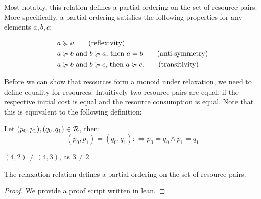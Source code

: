 Most notably, this relation defines a partial ordering on the set of resource pairs. More specifically, a partial ordering satisfies the following properties for any elements \(a, b, c\):

\begin{align}
   & a \relaxation a \tag{reflexivity} \\
   & a \relaxation b \text{ and } b \relaxation a\text{, then } a = b \tag{anti-symmetry}\\
   & a \relaxation b \text{ and } b \relaxation c\text{, then } a \relaxation c. \tag{transitivity}
\end{align}

Before we can show that resources form a monoid under relaxation, we need to define equality for resources. Intuitively two resource pairs are equal, if the respective initial cost is equal and the resource consumption is equal. Note that this is equivalent to the following definition:

\begin{definition}
   Let \((p_0, p_1), (q_0, q_1) \in \mathcal{R}\), then: 
   \[
      (p_0, p_1) = (q_0, q_1) :\iff p_0 = q_0 \wedge p_1 = q_1
   \]
\end{definition}

\begin{example}
   \((4, 2) \neq (4, 3)\), as \(3 \neq 2\).
\end{example}

\begin{lemma}
   The relaxation relation defines a partial ordering on the set of resource pairs.
\end{lemma}

\begin{proof}
   We provide a proof script written in lean.
\end{proof}



